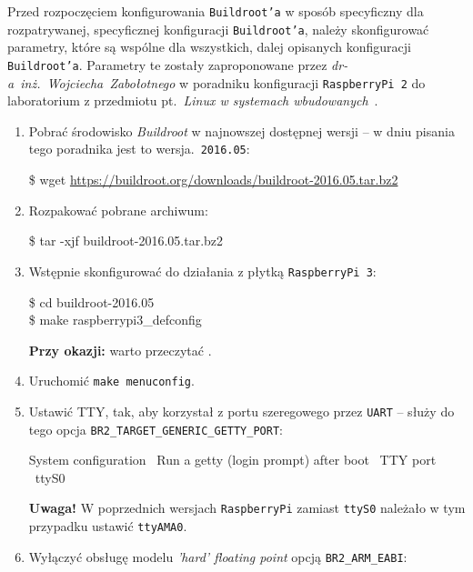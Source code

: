 \documentclass{article}
\newcommand{\brversion}{2016.05}
\newenvironment{ttblock}{\ttfamily}{\par}
\begin{document}
Przed rozpoczęciem konfigurowania \texttt{Buildroot'a} w sposób specyficzny dla rozpatrywanej, specyficznej konfiguracji \texttt{Buildroot'a}, należy skonfigurować parametry, które są wspólne dla wszystkich, dalej opisanych konfiguracji \texttt{Buildroot'a}. Parametry te zostały zaproponowane przez \emph{dr-a~inż.~Wojciecha~Zabołotnego} w poradniku konfiguracji \texttt{RaspberryPi~2} do laboratorium z przedmiotu pt.~\emph{Linux w systemach wbudowanych}~\cite{www:wzab}.
\begin{enumerate}
	\item Pobrać środowisko \emph{Buildroot} w najnowszej dostępnej wersji -- w dniu pisania tego poradnika jest to wersja.~\texttt{\brversion}:

	\begin{ttblock}
	\$ wget \url{https://buildroot.org/downloads/buildroot-\brversion.tar.bz2}
	\end{ttblock}

	\item Rozpakować pobrane archiwum:

	\begin{ttblock}
	\$ tar -xjf buildroot-\brversion.tar.bz2
	\end{ttblock}

	\item Wstępnie skonfigurować do działania z płytką \texttt{RaspberryPi 3}:

	\begin{ttblock}
	\$ cd buildroot-\brversion\\
	\$ make raspberrypi3\_defconfig
	\end{ttblock}
	\textbf{Przy okazji:} warto przeczytać .

	\item Uruchomić \texttt{make menuconfig}.

	\item Ustawić TTY, tak, aby korzystał z portu szeregowego przez \texttt{UART} -- służy do tego opcja \texttt{BR2\_TARGET\_GENERIC\_GETTY\_PORT}:

	\begin{ttblock}
	System configuration \textrightarrow\ Run a getty (login prompt) after boot \textrightarrow\ TTY port \textrightarrow\ ttyS0
	\end{ttblock}
	\textbf{Uwaga!} W poprzednich wersjach \texttt{RaspberryPi} zamiast \texttt{ttyS0} należało w tym przypadku ustawić \texttt{ttyAMA0}.

	\item Wyłączyć obsługę modelu \emph{'hard' floating point} opcją \texttt{BR2\_ARM\_EABI}:


\end{enumerate}
\end{document}
